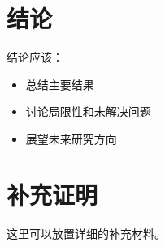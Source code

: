 \documentclass[12pt,a4paper]{article}
\theoremstyle{definition}
\begin{document}
\section{结论}\label{sec:conclusion}

结论应该：
\begin{itemize}
    \item 总结主要结果
    \item 讨论局限性和未解决问题
    \item 展望未来研究方向
\end{itemize}

\newpage


\appendix
\section{补充证明}

这里可以放置详细的补充材料。
\end{document}
